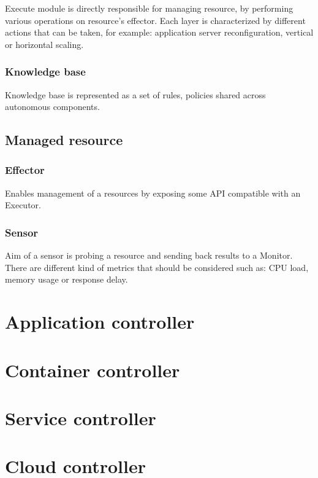 Execute module is directly responsible for managing resource, by performing various operations on resource's effector. Each layer is characterized by different actions that can be taken, for example: application server reconfiguration, vertical or horizontal scaling.

\subsubsection{Knowledge base}

Knowledge base is represented as a set of rules, policies shared across autonomous components.

\subsection{Managed resource}

\subsubsection{Effector}

Enables management of a resources by exposing some API compatible with an Executor.

\subsubsection{Sensor}

Aim of a sensor is probing a resource and sending back results to a Monitor. There are different kind of metrics that should be considered such as: CPU load, memory usage or response delay.



\section{Application controller}

\section{Container controller}

\section{Service controller}

\section{Cloud controller}